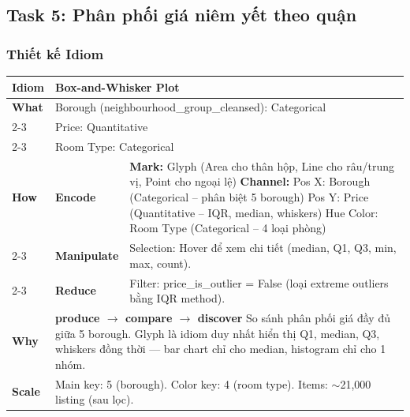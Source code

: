 \subsection{Task 5: Phân phối giá niêm yết theo quận}

\subsubsection{Thiết kế Idiom}

\begin{table}[H]
\centering
\renewcommand{\arraystretch}{1.1}
\begin{tabularx}{\textwidth}{|l|l|X|}
\hline
\textbf{Idiom} & \multicolumn{2}{l|}{\textbf{Box-and-Whisker Plot}} \\ \hline
\textbf{What}
& \multicolumn{2}{X|}{Borough (neighbourhood\_group\_cleansed): Categorical} \\ \cline{2-3}
& \multicolumn{2}{X|}{Price: Quantitative} \\ \cline{2-3}
& \multicolumn{2}{X|}{Room Type: Categorical} \\ \hline
\textbf{How}
& \textbf{Encode} &
\textbf{Mark:} Glyph (Area cho thân hộp, Line cho râu/trung vị, Point cho ngoại lệ) \newline
\textbf{Channel:} \newline
\hspace*{1em} Pos X: Borough (Categorical -- phân biệt 5 borough) \newline
\hspace*{1em} Pos Y: Price (Quantitative -- IQR, median, whiskers) \newline
\hspace*{1em} Hue Color: Room Type (Categorical -- 4 loại phòng) \\ \cline{2-3}
& \textbf{Manipulate} &
Selection: Hover để xem chi tiết (median, Q1, Q3, min, max, count). \\ \cline{2-3}
& \textbf{Reduce} &
Filter: price\_is\_outlier = False (loại extreme outliers bằng IQR method). \\ \hline
\textbf{Why} & \multicolumn{2}{X|}{
\textbf{produce $\rightarrow$ compare $\rightarrow$ discover} \newline
So sánh phân phối giá đầy đủ giữa 5 borough. Glyph là idiom duy nhất hiển thị Q1, median, Q3, whiskers đồng thời --- bar chart chỉ cho median, histogram chỉ cho 1 nhóm.
} \\ \hline
\textbf{Scale} & \multicolumn{2}{X|}{
Main key: 5 (borough). \newline
Color key: 4 (room type). \newline
Items: $\sim$21,000 listing (sau lọc).
} \\ \hline
\end{tabularx}
\end{table}

